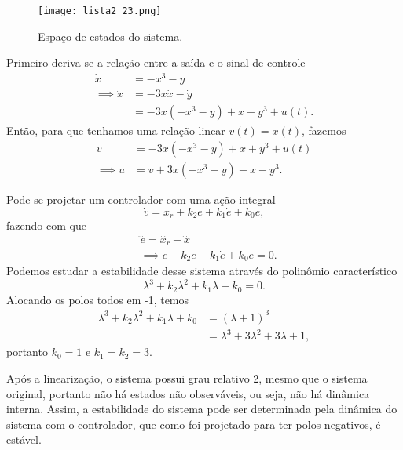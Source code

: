 \documentclass[a4paper]{report}
\begin{document}
\begin{figure}[H]
    \centering
    \texttt{[image: lista2\_23.png]}
    \caption{Espaço de estados do sistema.}
    \label{fig:lista2_23-png}
\end{figure}



Primeiro deriva-se a relação entre a saída e o sinal de controle
\begin{align*}
    \dot{x} &= -x^3 - y \\
    \implies \ddot{x} &= -3x \dot{x} -\dot{y} \\
		      &= -3x \left( -x^3 - y \right) +x +y^3 +u(t)
.\end{align*}
Então, para que tenhamos uma relação linear $v(t) = \ddot{x}(t)$, fazemos
\begin{align*}
    v &= -3x \left( -x^3 - y \right) +x +y^3 +u(t) \\
    \implies u &= v +3x \left( -x^3 - y \right) -x -y^3
.\end{align*}


Pode-se projetar um controlador com uma ação integral \[
    \dot{v} = \dddot{x_r} + k_2\ddot{e}+ k_1\dot{e} + k_0 e
,\] fazendo com que
\begin{align*}
    &\dddot{e} = \dddot{x_r} - \dddot{x} \\
    &\implies \dddot{e}+ k_2\ddot{e}+ k_1\dot{e} + k_0 e = 0
.\end{align*}
Podemos estudar a estabilidade desse sistema através do polinômio característico \[
    \lambda^3 + k_2\lambda^2 + k_1\lambda + k_0 = 0
.\] Alocando os polos todos em -1, temos
\begin{align*}
    \lambda^3 + k_2\lambda^2 + k_1\lambda + k_0 &= \left( \lambda + 1 \right)^3 \\
						&= \lambda^3 + 3\lambda^2 + 3\lambda + 1
,\end{align*}
portanto $k_0=1$ e $k_1=k_2=3$.


Após a linearização, o sistema possui grau relativo 2, mesmo que o sistema original, portanto não há estados não observáveis, ou seja, não há dinâmica interna. Assim, a estabilidade do sistema pode ser determinada pela dinâmica do sistema com o controlador, que como foi projetado para ter polos negativos, é estável.

\end{document}
